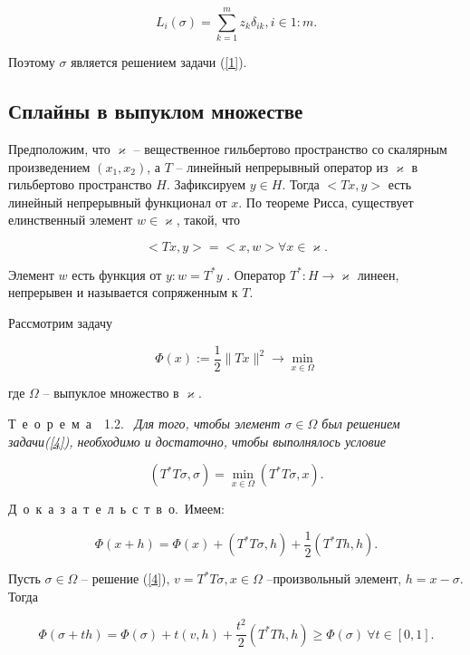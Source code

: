 \documentclass{book}
\newcommand{\theorem}[1]{Т~е~о~р~е~м~а~~#1.\ }
\newcommand{\proof}{Д~о~к~а~з~а~т~е~л~ь~с~т~в~о.\ }
\begin{document}
\begin{equation*}
L_i(\sigma)=\sum_{k=1}^m z_k \delta_{ik}, i\in 1:m.
\end{equation*}

\noindent Поэтому $\sigma$ является решением задачи (\ref{1}).

\subsection{Сплайны в выпуклом множестве} Предположим, что $\varkappa$ -- вещественное гильбертово пространство со скалярным произведением $(x_1, x_2)$, а $T$ -- линейный непрерывный оператор из $\varkappa$ в гильбертово пространство $H$. Зафиксируем $y\in H$. Тогда $<Tx, y>$ есть линейный непрерывный функционал от $x$. По теореме Рисса, существует елинственный элемент $w\in\varkappa$, такой, что

\begin{equation*}
<Tx, y>=<x, w> \forall x\in\varkappa.
\end{equation*}

\noindent Элемент $w$ есть функция от $y:w=T^\ast y$ . Оператор $T^\ast:H\rightarrow\varkappa$ линеен, непрерывен и называется сопряженным к $T$.
\par Рассмотрим задачу

\begin{equation}
\Phi(x):=\frac{1}{2}\|Tx\|^2\rightarrow\min_{x\in\Omega}
\label{4}
\end{equation}

\noindent где $\Omega$ -- выпуклое множество в $\varkappa$.
\par\theorem{1.2} \textit{Для того, чтобы элемент $\sigma\in\Omega$ был решением задачи\textup{(\ref{4})}, необходимо и достаточно, чтобы выполнялось условие}

\begin{equation}
(T^\ast T\sigma, \sigma)=\min_{x\in\Omega}{(T^\ast T\sigma, x)}.
\label{5}
\end{equation}

\par\proof Имеем:

\begin{equation*}
\Phi(x+h)=\Phi(x)+(T^\ast T\sigma, h)+\frac{1}{2}(T^\ast Th, h).
\end{equation*}

\noindent Пусть $\sigma\in\Omega$ -- решение (\ref{4}), $v=T^\ast T\sigma, x\in\Omega$ --произвольный элемент, $h=x-\sigma$. Тогда

\begin{equation*}
\Phi(\sigma+th)=\Phi(\sigma)+t(v, h)+\frac{t^2}{2}(T^*Th, h)\geq\Phi(\sigma)\  \forall t\in[0, 1].
\end{equation*}
\end{document}
